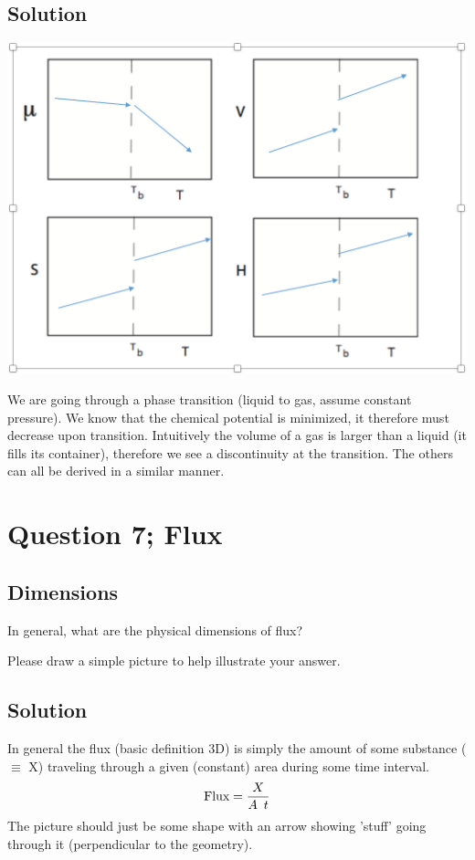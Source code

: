 \documentclass{article}
\newcommand{\be}{\begin{equation}}
\newcommand{\ee}{\end{equation}}
\begin{document}
\subsection*{Solution}
\includegraphics{b_ps6.png}

We are going through a phase transition (liquid to gas, assume constant pressure). 
We know that the chemical potential is minimized, it therefore must decrease upon transition. 
Intuitively the volume of a gas is larger than a liquid (it fills its container), therefore we see a discontinuity at the transition.
The others can all be derived in a similar manner. 

\newpage

\section*{Question 7; Flux}

\subsection*{Dimensions}
In general, what are the physical dimensions of flux?

Please draw a simple picture to help illustrate your answer. 

\subsection*{Solution}
In general the flux (basic definition 3D) is simply the amount  of some substance ($\equiv$ X) traveling through a given (constant) area during some time interval. 
\be
\text{Flux} = \frac{X}{A \enskip t}
\ee
The picture should just be some shape with an arrow showing 'stuff' going through it (perpendicular to the geometry). 
\end{document}
